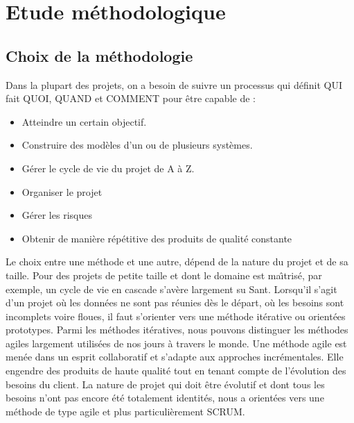 \section{ Etude m\'{e}thodologique }



  \subsection{Choix de la   m\'{e}thodologie}

  Dans la plupart des projets, on a besoin de suivre un processus qui d\'{e}finit
QUI fait QUOI, QUAND et COMMENT pour \^{e}tre capable de :

\begin{itemize}
\item{Atteindre un certain objectif.}
\item{Construire des mod\`{e}les d'un ou de plusieurs syst\`{e}mes.}
\item{G\'{e}rer le cycle de vie du projet de A \`{a} Z.}
\item{Organiser le projet}
\item{G\'{e}rer les risques}
\item{Obtenir de mani\`{e}re r\'{e}p\'{e}titive des produits de qualit\'{e} constante}
\end{itemize}

Le choix entre une m\'{e}thode et une autre, d\'{e}pend de la nature du projet et de sa taille. Pour des
projets de petite taille et dont le domaine est ma\^{\i}tris\'{e}, par exemple, un cycle de vie en cascade
s'av\`{e}re largement su Sant. Lorsqu'il s'agit d'un projet o\`{u} les donn\'{e}es ne sont pas r\'{e}unies d\`{e}s le
d\'{e}part, o\`{u} les besoins sont incomplets voire floues, il faut s'orienter vers une m\'{e}thode it\'{e}rative
ou orient\'{e}es prototypes. \newline
Parmi les m\'{e}thodes it\'{e}ratives, nous pouvons distinguer les m\'{e}thodes agiles largement utilis\'{e}es
de nos jours \`{a} travers le monde. \newline
Une m\'{e}thode agile est men\'{e}e dans un esprit collaboratif et
s'adapte aux approches incr\'{e}mentales. Elle engendre des produits de haute qualit\'{e} tout en tenant
compte de l'\'{e}volution des besoins du client.\newline
La nature de projet qui doit \^{e}tre \'{e}volutif et dont tous les besoins n'ont pas encore \'{e}t\'{e}
totalement identit\'{e}s, nous a orient\'{e}es vers une m\'{e}thode de type agile et plus particuli\`{e}rement
SCRUM.

